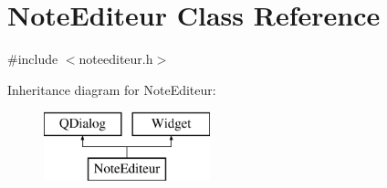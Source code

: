 \hypertarget{classNoteEditeur}{}\section{Note\+Editeur Class Reference}
\label{classNoteEditeur}


{\ttfamily \#include $<$noteediteur.\+h$>$}

Inheritance diagram for Note\+Editeur\+:\begin{figure}[H]
\begin{center}
\leavevmode
\includegraphics[height=2.000000cm]{classNoteEditeur}
\end{center}
\end{figure}
